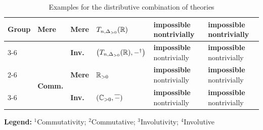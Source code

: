 \begin{table}[!h]
\begin{threeparttable}
\begin{tabular}{|l|l|l|>{\centering\arraybackslash}p{3.5cm}|>{\centering\arraybackslash}p{3.5cm}|>{\centering\arraybackslash}p{3.5cm}|}
  \multirow{4}{*}{\textbf{Group}}
  & \multirow{2}{*}{\textbf{Mere}} & \textbf{Mere} & $T_{n,\Delta_{>0}}(\mathbb R)$ & \textbf{impossible} nontrivially & \textbf{impossible} nontrivially \\ \cline{3-6}
  &                                   & \textbf{Inv.} & $\bigl( T_{n,\Delta_{>0}}(\mathbb R), -^\dagger \bigr)$ & \textbf{impossible} nontrivially & \textbf{impossible} nontrivially \\ \cline{2-6}
  & \multirow{2}{*}{\textbf{Comm.}} & \textbf{Mere} & $\mathbb R_{>0}$ & \textbf{impossible} nontrivially & \textbf{impossible} nontrivially \\ \cline{3-6}
  &                                   & \textbf{Inv.} & $(\mathbb C_{>0}, \overline{-})$ & \textbf{impossible} nontrivially & \textbf{impossible} nontrivially \\ \hline

  \end{tabular}
  \small \textbf{Legend:} ${}^1$Commutativity;\; ${}^2$Commutative;\; ${}^3$Involutivity;\; ${}^4$Involutive
\end{threeparttable}
  \caption{Examples for the distributive combination of theories}
  \label{tbl:combination-table}
\end{table}

